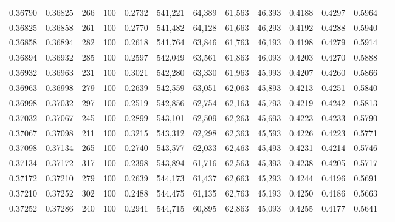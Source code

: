 \begin{tabular}{rrrrrrrrrrrrr}
0.36790 & 0.36825 &   266 & 100 &                                     0.2732 & 541,221 &  64,389 &  61,563 &  46,393 & 0.4188 & 0.4297 & 0.5964 \\
0.36825 & 0.36858 &   261 & 100 &                                     0.2770 & 541,482 &  64,128 &  61,663 &  46,293 & 0.4192 & 0.4288 & 0.5940 \\
0.36858 & 0.36894 &   282 & 100 &                                     0.2618 & 541,764 &  63,846 &  61,763 &  46,193 & 0.4198 & 0.4279 & 0.5914 \\
0.36894 & 0.36932 &   285 & 100 &                                     0.2597 & 542,049 &  63,561 &  61,863 &  46,093 & 0.4203 & 0.4270 & 0.5888 \\
0.36932 & 0.36963 &   231 & 100 &                                     0.3021 & 542,280 &  63,330 &  61,963 &  45,993 & 0.4207 & 0.4260 & 0.5866 \\
0.36963 & 0.36998 &   279 & 100 &                                     0.2639 & 542,559 &  63,051 &  62,063 &  45,893 & 0.4213 & 0.4251 & 0.5840 \\
0.36998 & 0.37032 &   297 & 100 &                                     0.2519 & 542,856 &  62,754 &  62,163 &  45,793 & 0.4219 & 0.4242 & 0.5813 \\
0.37032 & 0.37067 &   245 & 100 &                                     0.2899 & 543,101 &  62,509 &  62,263 &  45,693 & 0.4223 & 0.4233 & 0.5790 \\
0.37067 & 0.37098 &   211 & 100 &                                     0.3215 & 543,312 &  62,298 &  62,363 &  45,593 & 0.4226 & 0.4223 & 0.5771 \\
0.37098 & 0.37134 &   265 & 100 &                                     0.2740 & 543,577 &  62,033 &  62,463 &  45,493 & 0.4231 & 0.4214 & 0.5746 \\
0.37134 & 0.37172 &   317 & 100 &                                     0.2398 & 543,894 &  61,716 &  62,563 &  45,393 & 0.4238 & 0.4205 & 0.5717 \\
0.37172 & 0.37210 &   279 & 100 &                                     0.2639 & 544,173 &  61,437 &  62,663 &  45,293 & 0.4244 & 0.4196 & 0.5691 \\
0.37210 & 0.37252 &   302 & 100 &                                     0.2488 & 544,475 &  61,135 &  62,763 &  45,193 & 0.4250 & 0.4186 & 0.5663 \\
0.37252 & 0.37286 &   240 & 100 &                                     0.2941 & 544,715 &  60,895 &  62,863 &  45,093 & 0.4255 & 0.4177 & 0.5641 \\

\end{tabular}
